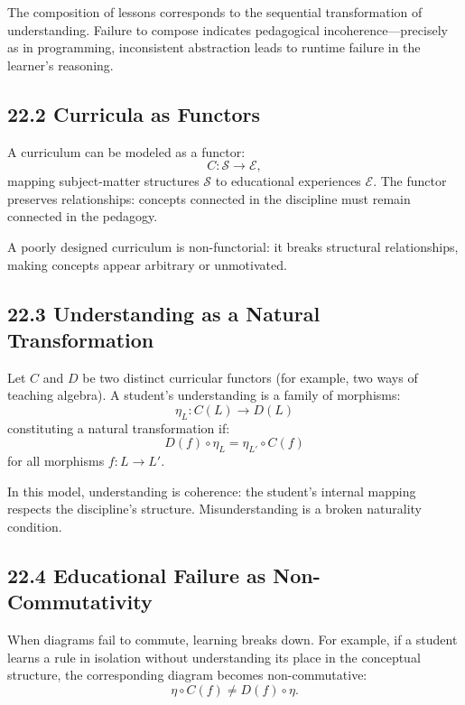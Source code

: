\documentclass[12pt,letterpaper]{article}
\theoremstyle{remark}
\begin{document}
The composition of lessons corresponds to the sequential transformation of understanding. Failure to compose indicates pedagogical incoherence—precisely as in programming, inconsistent abstraction leads to runtime failure in the learner’s reasoning.

\subsection{22.2 Curricula as Functors}

A curriculum can be modeled as a functor:
\[
C: \mathcal{S} \to \mathcal{E},
\]
mapping subject-matter structures \(\mathcal{S}\) to educational experiences \(\mathcal{E}\). The functor preserves relationships: concepts connected in the discipline must remain connected in the pedagogy.

A poorly designed curriculum is non-functorial: it breaks structural relationships, making concepts appear arbitrary or unmotivated.

\subsection{22.3 Understanding as a Natural Transformation}

Let \(C\) and \(D\) be two distinct curricular functors (for example, two ways of teaching algebra). A student’s understanding is a family of morphisms:
\[
\eta_L : C(L) \to D(L)
\]
constituting a natural transformation if:
\[
D(f) \circ \eta_L = \eta_{L'} \circ C(f)
\]
for all morphisms \(f: L \to L'\).

In this model, understanding is coherence: the student’s internal mapping respects the discipline’s structure. Misunderstanding is a broken naturality condition.

\subsection{22.4 Educational Failure as Non-Commutativity}

When diagrams fail to commute, learning breaks down. For example, if a student learns a rule in isolation without understanding its place in the conceptual structure, the corresponding diagram becomes non-commutative:
\[
\eta \circ C(f) \neq D(f) \circ \eta.
\]
\end{document}
